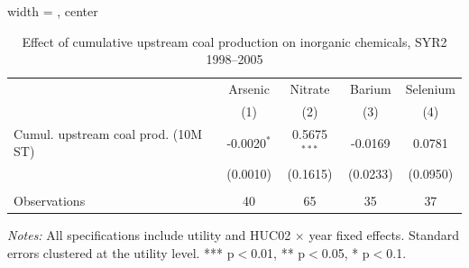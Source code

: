 \begin{table}[htbp]
   
   \caption{\label{tab:6yr_huc02fe_inorg_ravalli_2005_step23} Effect of cumulative upstream coal production on inorganic chemicals, SYR2 1998--2005}
   \bigskip
   
   \centering
   
\begin{adjustbox}{width = \textwidth, center}
   \begin{tabular}{lcccc}
      \toprule
       & Arsenic & Nitrate & Barium & Selenium \\
                                          & (1)           & (2)            & (3)      & (4)\\  
      \midrule 
      Cumul. upstream coal prod. (10M ST) & -0.0020$^{*}$ & 0.5675$^{***}$ & -0.0169  & 0.0781\\   
                                          & (0.0010)      & (0.1615)       & (0.0233) & (0.0950)\\   
       \\
      Observations                        & 40            & 65             & 35       & 37\\  
      \bottomrule
   \end{tabular}
\end{adjustbox}
   
   {\tiny\linespread{1}\selectfont \par \raggedright 
   \textit{Notes:} All specifications include utility and HUC02 $\times$ year fixed effects. Standard errors clustered at the utility level. *** p$<$0.01, ** p$<$0.05, * p$<$0.1.}
   
\end{table}



